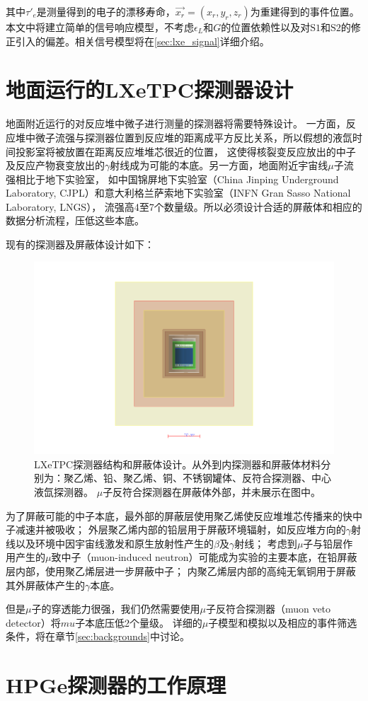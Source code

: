 其中$\tau'_e$是测量得到的电子的漂移寿命，$\vec{x_r}=(x_r,y_r,z_r)$为重建得到的事件位置。
本文中将建立简单的信号响应模型，不考虑$\epsilon_L$和$G$的位置依赖性以及对$\mathrm{S1}$和$\mathrm{S2}$的修正引入的偏差。相关信号模型将在\ref{sec:lxe_signal}详细介绍。

\section{地面运行的LXeTPC探测器设计}

地面附近运行的对反应堆中微子进行测量的探测器将需要特殊设计。
一方面，反应堆中微子流强与探测器位置到反应堆的距离成平方反比关系，所以假想的液氙时间投影室将被放置在距离反应堆堆芯很近的位置，
这使得核裂变反应放出的中子及反应产物衰变放出的$\gamma$射线成为可能的本底。另一方面，地面附近宇宙线$\mu$子流强相比于地下实验室，
如中国锦屏地下实验室（China Jinping Underground Laboratory, CJPL）和意大利格兰萨索地下实验室（INFN Gran Sasso National Laboratory, LNGS），
流强高4至7个数量级\cite{guo_muon_2021}。所以必须设计合适的屏蔽体和相应的数据分析流程，压低这些本底。

现有的探测器及屏蔽体设计如下：

\begin{figure}
    \centering
    \includegraphics[width=0.7\linewidth]{figures/nested.png}
    \caption{LXeTPC探测器结构和屏蔽体设计。从外到内探测器和屏蔽体材料分别为：聚乙烯、铅、聚乙烯、铜、不锈钢罐体、反符合探测器、中心液氙探测器。
    $\mu$子反符合探测器在屏蔽体外部，并未展示在图中。}
    \label{fig:relics_geo}
\end{figure}

为了屏蔽可能的中子本底，最外部的屏蔽层使用聚乙烯使反应堆堆芯传播来的快中子减速并被吸收；
外层聚乙烯内部的铅层用于屏蔽环境辐射，如反应堆方向的$\gamma$射线以及环境中因宇宙线激发和原生放射性产生的$\beta$及$\gamma$射线；
考虑到$\mu$子与铅层作用产生的$\mu$致中子（muon-induced neutron）可能成为实验的主要本底，在铅屏蔽层内部，使用聚乙烯层进一步屏蔽中子；
内聚乙烯层内部的高纯无氧铜用于屏蔽其外屏蔽体产生的$\gamma$本底。

但是$\mu$子的穿透能力很强，我们仍然需要使用$\mu$子反符合探测器（muon veto detector）将$mu$子本底压低2个量级。
详细的$\mu$子模型和模拟以及相应的事件筛选条件，将在章节\ref{sec:backgrounds}中讨论。

\section{HPGe探测器的工作原理}
